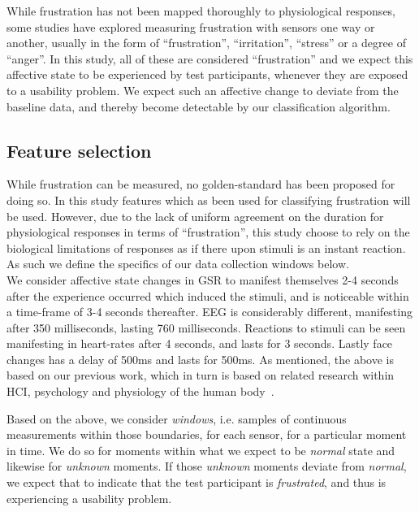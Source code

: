 While frustration has not been mapped thoroughly to physiological responses, some studies have explored measuring
frustration with sensors one way or another, usually in the form of ``frustration'', ``irritation'', ``stress'' or a
degree of ``anger''. In this study, all of these are considered ``frustration'' and we expect this affective state to be
experienced by test participants, whenever they are exposed to a usability problem. We expect such an affective change
to deviate from the baseline data, and thereby become detectable by our classification algorithm.

\subsection{Feature selection}

While frustration can be measured, no golden-standard has been proposed for doing so. 
In this study features which as been used for classifying frustration will be used.
However, due to the lack of uniform agreement on the duration for physiological responses in terms of ``frustration'', this study choose to rely on the biological limitations of responses as if there upon stimuli is an instant reaction.
As such we define the specifics of our data collection windows below.\\
We consider affective state changes in GSR to manifest themselves 2-4 seconds after the experience occurred which
induced the stimuli, and is noticeable within a time-frame of 3-4 seconds thereafter. EEG is considerably different,
manifesting after 350 milliseconds, lasting 760 milliseconds. Reactions to stimuli can be seen manifesting in heart-rates
after 4 seconds, and lasts for 3 seconds. Lastly face changes has a delay of 500ms and lasts for 500ms. As mentioned,
the above is based on our previous work, which in turn is based on related research within HCI, psychology and
physiology of the human body~\cite{9th_semester_project}.

Based on the above, we consider \textit{windows}, i.e. samples of continuous measurements within those boundaries, for
each sensor, for a particular moment in time. We do so for moments within what we expect to be \textit{normal} state and
likewise for \textit{unknown} moments. If those \textit{unknown} moments deviate from \textit{normal}, we expect that to
indicate that the test participant is \textit{frustrated}, and thus is experiencing a usability problem.


